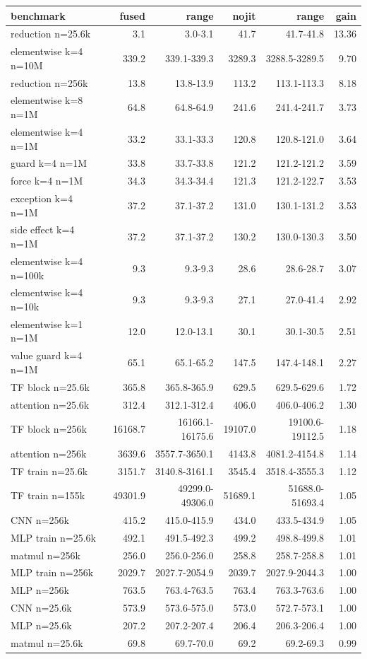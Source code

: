 \begin{tabular}{lrrrrr}
\toprule
benchmark & fused & range & nojit & range & gain \\
\midrule
reduction n=25.6k & 3.1 & 3.0-3.1 & 41.7 & 41.7-41.8 & 13.36 \\
elementwise k=4 n=10M & 339.2 & 339.1-339.3 & 3289.3 & 3288.5-3289.5 & 9.70 \\
reduction n=256k & 13.8 & 13.8-13.9 & 113.2 & 113.1-113.3 & 8.18 \\
elementwise k=8 n=1M & 64.8 & 64.8-64.9 & 241.6 & 241.4-241.7 & 3.73 \\
elementwise k=4 n=1M & 33.2 & 33.1-33.3 & 120.8 & 120.8-121.0 & 3.64 \\
guard k=4 n=1M & 33.8 & 33.7-33.8 & 121.2 & 121.2-121.2 & 3.59 \\
force k=4 n=1M & 34.3 & 34.3-34.4 & 121.3 & 121.2-122.7 & 3.53 \\
exception k=4 n=1M & 37.2 & 37.1-37.2 & 131.0 & 130.1-131.2 & 3.53 \\
side effect k=4 n=1M & 37.2 & 37.1-37.2 & 130.2 & 130.0-130.3 & 3.50 \\
elementwise k=4 n=100k & 9.3 & 9.3-9.3 & 28.6 & 28.6-28.7 & 3.07 \\
elementwise k=4 n=10k & 9.3 & 9.3-9.3 & 27.1 & 27.0-41.4 & 2.92 \\
elementwise k=1 n=1M & 12.0 & 12.0-13.1 & 30.1 & 30.1-30.5 & 2.51 \\
value guard k=4 n=1M & 65.1 & 65.1-65.2 & 147.5 & 147.4-148.1 & 2.27 \\
TF block n=25.6k & 365.8 & 365.8-365.9 & 629.5 & 629.5-629.6 & 1.72 \\
attention n=25.6k & 312.4 & 312.1-312.4 & 406.0 & 406.0-406.2 & 1.30 \\
TF block n=256k & 16168.7 & 16166.1-16175.6 & 19107.0 & 19100.6-19112.5 & 1.18 \\
attention n=256k & 3639.6 & 3557.7-3650.1 & 4143.8 & 4081.2-4154.8 & 1.14 \\
TF train n=25.6k & 3151.7 & 3140.8-3161.1 & 3545.4 & 3518.4-3555.3 & 1.12 \\
TF train n=155k & 49301.9 & 49299.0-49306.0 & 51689.1 & 51688.0-51693.4 & 1.05 \\
CNN n=256k & 415.2 & 415.0-415.9 & 434.0 & 433.5-434.9 & 1.05 \\
MLP train n=25.6k & 492.1 & 491.5-492.3 & 499.2 & 498.8-499.8 & 1.01 \\
matmul n=256k & 256.0 & 256.0-256.0 & 258.8 & 258.7-258.8 & 1.01 \\
MLP train n=256k & 2029.7 & 2027.7-2054.9 & 2039.7 & 2027.9-2044.3 & 1.00 \\
MLP n=256k & 763.5 & 763.4-763.5 & 763.4 & 763.3-763.6 & 1.00 \\
CNN n=25.6k & 573.9 & 573.6-575.0 & 573.0 & 572.7-573.1 & 1.00 \\
MLP n=25.6k & 207.2 & 207.2-207.4 & 206.4 & 206.3-206.4 & 1.00 \\
matmul n=25.6k & 69.8 & 69.7-70.0 & 69.2 & 69.2-69.3 & 0.99 \\
\bottomrule
\end{tabular}
